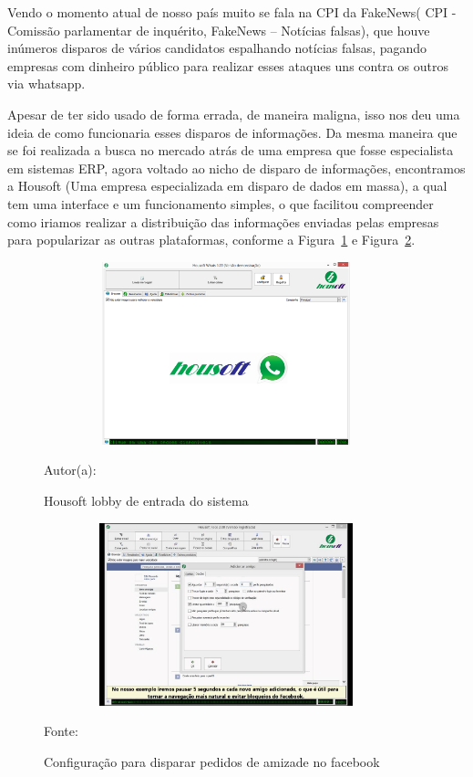 Vendo o momento atual de nosso país muito se fala na CPI da FakeNews( CPI - Comissão parlamentar de inquérito, FakeNews – Notícias falsas), que houve inúmeros disparos de vários candidatos espalhando notícias falsas, pagando empresas com dinheiro público para realizar esses ataques uns contra os outros via whatsapp.

Apesar de ter sido usado de forma errada, de maneira maligna, isso nos deu uma ideia de como funcionaria esses disparos de informações. Da mesma maneira que se foi realizada a busca no mercado atrás de uma empresa que fosse especialista em sistemas ERP, agora voltado ao nicho de disparo de informações, encontramos a Housoft (Uma empresa especializada em disparo de dados em massa), a qual tem uma interface e um funcionamento simples, o que facilitou compreender como iriamos realizar a distribuição das informações enviadas pelas empresas para popularizar as outras plataformas, conforme a Figura~\hypersetup{linkcolor=black}\ref{fig:housoft1} e Figura~\hypersetup{linkcolor=black}\ref{fig:housoft2}.

\begin{figure}[!h]
	\centering
	\caption{Housoft lobby de entrada do sistema}
	\label{fig:housoft1}
	\includegraphics[width=400px, height=200px]{./images/housoft.png}
	\par {Autor(a): \cite{housoft}}
\end{figure}

\begin{figure}[!h]
	\centering
	\caption{Configuração para disparar pedidos de amizade no facebook}
	\includegraphics[width=400px, height=200px]{./images/housoft1.jpg}
		\label{fig:housoft2}
	\par {Fonte: \cite{housoft}}
\end{figure}

